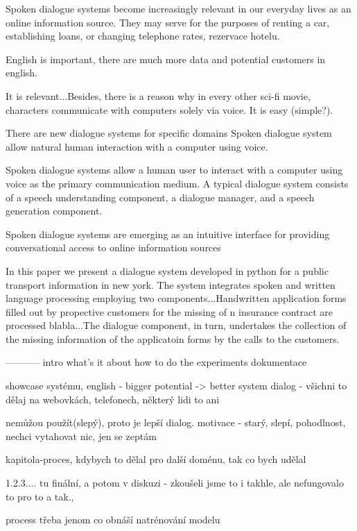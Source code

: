 Spoken dialogue systems become increasingly relevant in our everyday lives as an online information source.
They may serve for the purposes of renting a car, establishing loans, or changing telephone rates, rezervace hotelu.

English is important, there are much more data and potential customers in english.

It is relevant...Besides, there is a reason why in every other sci-fi movie, characters communicate with computers solely via voice. It is easy (simple?).

There are new dialogue systems for specific domains
Spoken dialogue system allow natural human interaction with a computer using voice. 

Spoken dialogue systems allow a human user to interact with a computer using voice as the primary communication medium.
A typical dialogue system consists of a speech understanding component, a dialogue manager, and a speech generation component.

Spoken dialogue systems are emerging as an intuitive interface for providing conversational access to online information sources

In this paper we present a dialogue system developed in python for a public transport information in new york. The system integrates spoken and written language processing employing two components...Handwritten application forms filled out by propective customers for the missing of n insurance contract are processed blabla...The dialogue component, in turn, undertakes the collection of the missing information of the applicatoin forms by the calls to the customers. 

-----------
intro
what's it about
how to do the experiments
dokumentace

showcase systému, english - bigger potential -> better system
dialog - všichni to dělaj na webovkách, telefonech, některý lidi to ani 

nemůžou použít(slepý), proto je lepší dialog. 
motivace - starý, slepí, pohodlnost, nechci vytahovat nic, jen se zeptám

kapitola-proces, kdybych to dělal pro další doménu, tak co bych udělal 

1.2.3....
tu finální, a potom v diskuzi - zkoušeli jsme to i takhle, ale 
nefungovalo to pro to a tak.,

process třeba jenom co obnáší natrénování modelu


